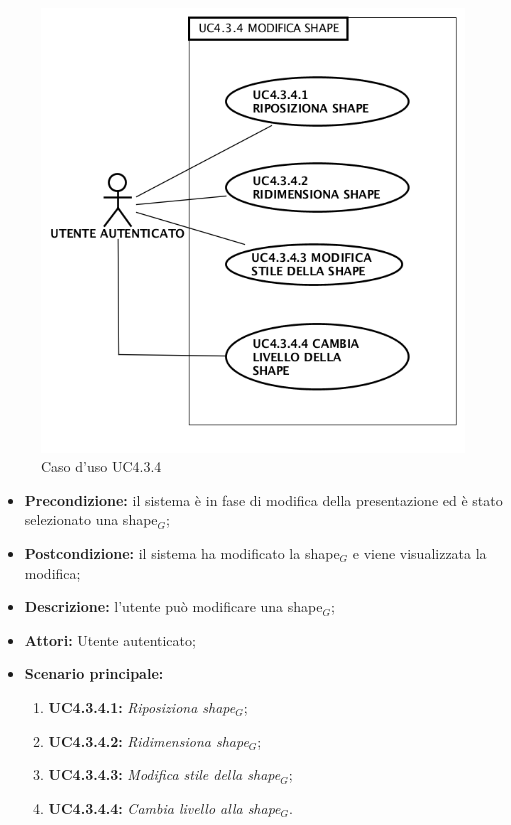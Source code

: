 \begin{figure}[H]
	\begin{center}
	\includegraphics[scale=0.4]{diagram/UC4-3-4.png}
	\caption{Caso d'uso UC4.3.4}
	\end{center}
\end{figure}
\begin{itemize}
	\item \textbf{Precondizione:} il sistema è in fase di modifica della presentazione ed è stato selezionato una shape$_G$;
	\item \textbf{Postcondizione:} il sistema ha modificato la shape$_G$ e viene visualizzata la modifica;
	\item \textbf{Descrizione:} l'utente può modificare una shape$_G$;
	\item \textbf{Attori:} Utente autenticato;
	\item \textbf{Scenario principale:}
	\begin{enumerate}
		\item \textbf{ UC4.3.4.1:} \textit{ Riposiziona shape$_G$};
		\item \textbf{ UC4.3.4.2:} \textit{ Ridimensiona shape$_G$};
		\item \textbf{ UC4.3.4.3:} \textit{ Modifica stile della shape$_G$};
		\item \textbf{ UC4.3.4.4:} \textit{ Cambia livello alla shape$_G$}.
	\end{enumerate}
\end{itemize}
